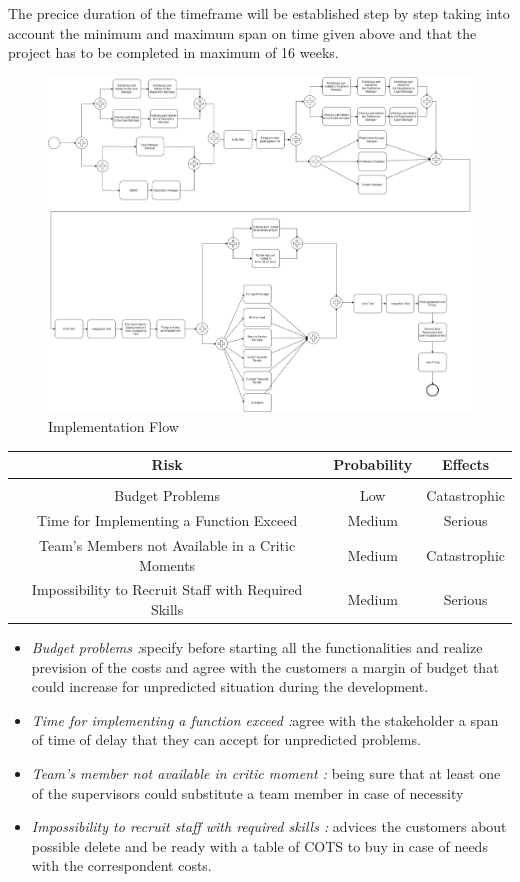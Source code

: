 The precice duration of the timeframe will be established step by step taking into account the minimum and maximum span on time given above and that the project has to be completed in maximum of 16 weeks.

\begin{figure}[H]
	\centering
	\includegraphics[scale=0.25]{Images/Implementation/Implementation_Flow}
	\caption{Implementation Flow}
\end{figure}

\begin{tabular}[H]{ccc}
	Risk & Probability & Effects\\
	\hline\\
	Budget Problems & Low & Catastrophic\\
	Time for Implementing a Function Exceed & Medium & Serious\\
	Team’s Members not Available in a Critic Moments & Medium & Catastrophic\\
	Impossibility to Recruit Staff with Required Skills & Medium & Serious
\end{tabular}

\begin{itemize}
	\item \emph{Budget problems :}specify before starting all the functionalities and realize prevision of the costs and agree with the customers a margin of budget that could increase for unpredicted situation during the development.
	
	\item \emph{Time for implementing a function exceed :}agree with the stakeholder a span of time of delay that they can accept for unpredicted problems.
	
	\item \emph{Team’s member not available in critic moment :} being sure that at least one of the supervisors could substitute a team member in case of necessity
	
	\item \emph{Impossibility to recruit staff with required skills :} advices the customers about possible delete and be ready with a table of COTS to buy in case of needs with the correspondent costs.
	
\end{itemize}
